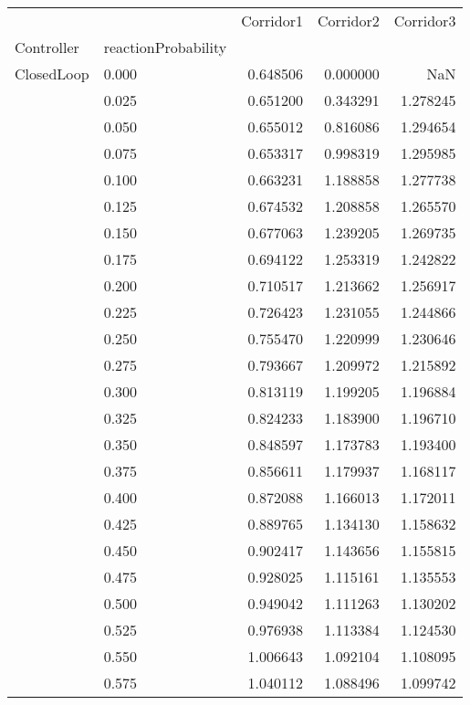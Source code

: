 \begin{tabular}{llrrr}
\toprule
         &       &  Corridor1 &  Corridor2 &  Corridor3 \\
Controller & reactionProbability &            &            &            \\
\midrule
ClosedLoop & 0.000 &   0.648506 &   0.000000 &        NaN \\
         & 0.025 &   0.651200 &   0.343291 &   1.278245 \\
         & 0.050 &   0.655012 &   0.816086 &   1.294654 \\
         & 0.075 &   0.653317 &   0.998319 &   1.295985 \\
         & 0.100 &   0.663231 &   1.188858 &   1.277738 \\
         & 0.125 &   0.674532 &   1.208858 &   1.265570 \\
         & 0.150 &   0.677063 &   1.239205 &   1.269735 \\
         & 0.175 &   0.694122 &   1.253319 &   1.242822 \\
         & 0.200 &   0.710517 &   1.213662 &   1.256917 \\
         & 0.225 &   0.726423 &   1.231055 &   1.244866 \\
         & 0.250 &   0.755470 &   1.220999 &   1.230646 \\
         & 0.275 &   0.793667 &   1.209972 &   1.215892 \\
         & 0.300 &   0.813119 &   1.199205 &   1.196884 \\
         & 0.325 &   0.824233 &   1.183900 &   1.196710 \\
         & 0.350 &   0.848597 &   1.173783 &   1.193400 \\
         & 0.375 &   0.856611 &   1.179937 &   1.168117 \\
         & 0.400 &   0.872088 &   1.166013 &   1.172011 \\
         & 0.425 &   0.889765 &   1.134130 &   1.158632 \\
         & 0.450 &   0.902417 &   1.143656 &   1.155815 \\
         & 0.475 &   0.928025 &   1.115161 &   1.135553 \\
         & 0.500 &   0.949042 &   1.111263 &   1.130202 \\
         & 0.525 &   0.976938 &   1.113384 &   1.124530 \\
         & 0.550 &   1.006643 &   1.092104 &   1.108095 \\
         & 0.575 &   1.040112 &   1.088496 &   1.099742 \\

\end{tabular}
